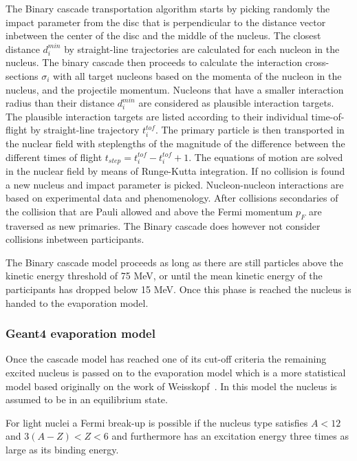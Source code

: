 The Binary cascade transportation algorithm starts by picking randomly the impact parameter from the disc that is perpendicular to the distance vector inbetween the center of the disc and the middle of the nucleus. The closest distance $d^{min}_{i}$ by straight-line trajectories are calculated for each nucleon in the nucleus. The binary cascade then proceeds to calculate the interaction cross-sections $\sigma_i$ with all target nucleons based on the momenta of the nucleon in the nucleus, and the projectile momentum. Nucleons that have a smaller interaction radius than their distance $d^{min}_{i}$ are considered as plausible interaction targets. The plausible interaction targets are listed according to their individual time-of-flight by straight-line trajectory $t^{tof}_i$. The primary particle is then transported in the nuclear field with steplengths of the magnitude of the difference between the different times of flight $t_{step} = t^{tof}_i - t^{tof}_i+1$. The equations of motion are solved in the nuclear field by means of Runge-Kutta integration. If no collision is found a new nucleus and impact parameter is picked.
Nucleon-nucleon interactions are based on experimental data and phenomenology. After collisions secondaries of the collision that are Pauli allowed and above the Fermi momentum $p_F$ are traversed as new primaries. The Binary cascade does however not consider collisions inbetween participants.

The Binary cascade model proceeds as long as there are still particles above the kinetic energy threshold  of 75 MeV, or until the mean kinetic energy of the participants has dropped below 15 MeV. Once this phase is reached the nucleus is handed to the evaporation model.

\subsubsection{Geant4 evaporation model}

Once the cascade model has reached one of its cut-off criteria the remaining excited nucleus is passed on to the evaporation model which is a more statistical model based originally on the work of Weisskopf~\cite{Weisskopf}. In this model the nucleus is assumed to be in an equilibrium state.

For light nuclei a Fermi break-up is possible if the nucleus type satisfies $A < 12$ and $3(A - Z) < Z < 6$ and furthermore has an excitation energy three times as large as its binding energy.

